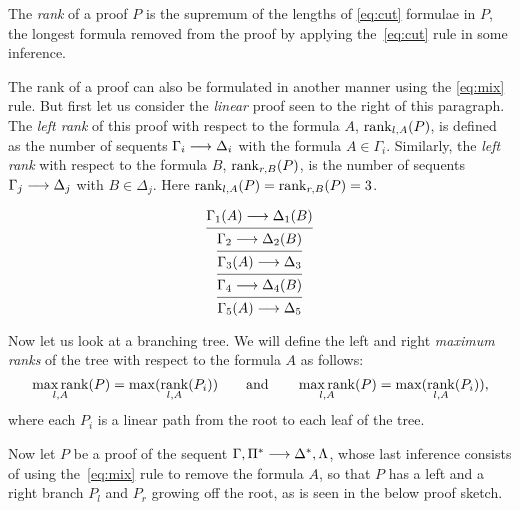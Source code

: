 \documentclass[11pt,a4paper]{article}
\begin{document}
\begin{definition}\label{def:rank of a proof}
    The \emph{rank} of a proof \(P\) is the supremum of the lengths
    of \eqref{eq:cut} formulae in \(P\), the longest formula
    removed from the proof by applying the~\eqref{eq:cut} rule
    in some inference.
\end{definition}

\begin{minipage}{0.7\textwidth}
The rank of a proof can also be formulated in another manner
using the \eqref{eq:mix} rule. But first let us consider the \emph{linear}
proof seen to the right of this paragraph. The \emph{left rank}
of this proof with respect to the formula \(A\),
\(\operatorname*{rank}_{l,A}(P)\), is defined as the number of sequents
\(\Gamma_i\longrightarrow\Delta_i\) with the formula \(A\in\Gamma_i\).
Similarly, the \emph{left rank} with respect to the formula \(B\),
\(\operatorname*{rank}_{r,B}(P)\), is the number of sequents \(\Gamma_j\longrightarrow\Delta_j\)
with \(B\in\Delta_j\). Here \(\operatorname*{rank}_{l,A}(P) = \operatorname*{rank}_{r,B}(P) = 3\).
\end{minipage}
\hfill
\begin{minipage}{0.3\textwidth}
\begin{equation*}
    \begin{prooftree}
        \hypo{\Gamma_1(A)\seq\Delta_1(B)}
        \infer1{\Gamma_2\seq\Delta_2(B)}
        \infer1{\Gamma_3(A)\seq\Delta_3}
        \infer1{\Gamma_4\seq\Delta_4(B)}
        \infer1{\Gamma_5(A)\seq\Delta_5}
    \end{prooftree}
\end{equation*}
\end{minipage}

Now let us look at a branching tree.
We will define the left and right \emph{maximum ranks}
of the tree with respect to the formula \(A\) as follows:
\begin{equation*}
    \operatorname*{max\,rank}_{l,A}(P) = \max(\operatorname*{rank}_{l,A}(P_i))
    \qquad\text{and}\qquad
    \operatorname*{max\,rank}_{l,A}(P) = \max(\operatorname*{rank}_{l,A}(P_i)),
\end{equation*}
where each \(P_i\) is a linear path from the root
to each leaf of the tree.

Now let \(P\) be a proof of the sequent
\(\Gamma,\Pi^*\longrightarrow\Delta^*,\Lambda\), whose last inference consists of
using the~\eqref{eq:mix} rule to remove the formula \(A\), so that \(P\)
has a left and a right branch \(P_l\) and \(P_r\) growing off the root,
as is seen in the below proof sketch.
\end{document}
